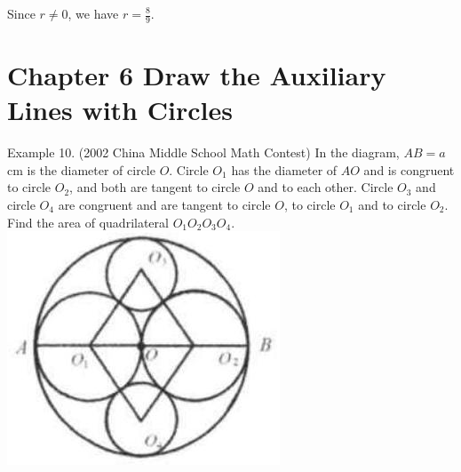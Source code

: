 \documentclass[10pt]{article}
\begin{document}
Since \(r \neq 0\), we have \(r=\frac{8}{9}\).

\section*{Chapter 6 Draw the Auxiliary Lines with Circles}
Example 10. (2002 China Middle School Math Contest) In the diagram, \(A B=a\) cm is the diameter of circle \(O\). Circle \(O_{1}\) has the diameter of \(A O\) and is congruent to circle \(O_{2}\), and both are tangent to circle \(O\) and to each other. Circle \(O_{3}\) and circle \(O_{4}\) are congruent and are tangent to circle \(O\), to circle \(O_{1}\) and to circle \(O_{2}\). Find the area of quadrilateral \(O_{1} O_{2} O_{3} O_{4}\).\\
\includegraphics[max width=\textwidth, center]{2025_04_17_97bc1f7e44d93c271a88g-182}
\end{document}
